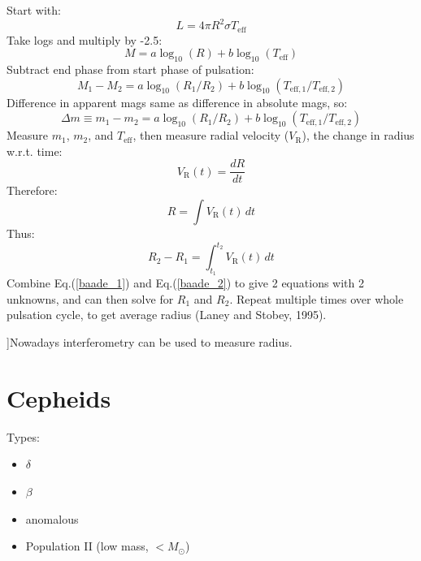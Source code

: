 \documentclass{spy}
\begin{document}
Start with:
\begin{equation}
    L = 4 \pi R^2 \sigma T_\mathrm{eff}
\end{equation}
Take logs and multiply by -2.5:
\begin{equation}
    M = a \log_\mathrm{10}(R) + b \log_\mathrm{10}(T_\mathrm{eff})
\end{equation}
Subtract end phase from start phase of pulsation:
\begin{equation}
    M_\mathrm{1}- M_\mathrm{2}= a \log_\mathrm{10}(R_\mathrm{1}/R_\mathrm{2}) + b \log_\mathrm{10}(T_\mathrm{eff,1}/T_\mathrm{eff,2})
\end{equation}
Difference in apparent mags same as difference in absolute mags, so:
\begin{equation}
    \Delta m \equiv m_\mathrm{1}- m_\mathrm{2}= a \log_\mathrm{10}(R_\mathrm{1}/R_\mathrm{2}) + b \log_\mathrm{10}(T_\mathrm{eff,1}/T_\mathrm{eff,2})
\label{baade_1}
\end{equation}
Measure \(m_\mathrm{1}\), \(m_\mathrm{2}\), and \(T_\mathrm{eff}\), then measure radial velocity (\(V_\mathrm{R}\)), the change in radius w.r.t. time:
\begin{equation}
    V_\mathrm{R}(t) = \frac{dR}{dt}
\end{equation}
Therefore:
\begin{equation}
    R = \int V_\mathrm{R}(t) \,dt
\end{equation}
Thus:
\begin{equation}
    R_\mathrm{2} - R_\mathrm{1} = \int_{t_\mathrm{1}}^{t_\mathrm{2}} V_\mathrm{R}(t) \,dt
\label{baade_2}
\end{equation}
Combine Eq.(\ref{baade_1}) and Eq.(\ref{baade_2}) to give 2 equations with 2 unknowns, and can then solve for \(R_\mathrm{1}\) and \(R_\mathrm{2}\).
Repeat multiple times over whole pulsation cycle, to get average radius (Laney and Stobey, 1995).

]Nowadays interferometry can be used to measure radius. 

\section{Cepheids}
Types:
\begin{itemize}
    \item \(\delta\)
    \item \(\beta\)
    \item anomalous
    \item Population II (low mass, \(< M_\odot\))
\end{itemize}
    
\end{document}

